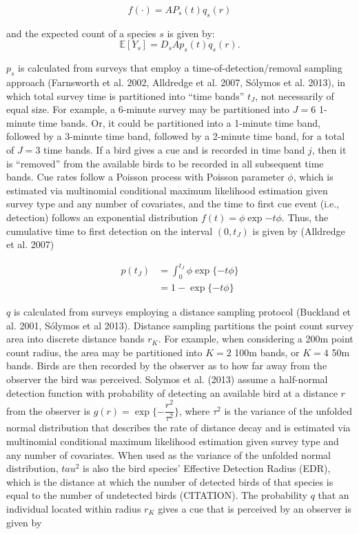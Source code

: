 \documentclass[]{article}
\begin{document}
$$
	f(\cdot) = AP_s(t)q_s(r)
$$

and the expected count of a species $s$ is given by:
\begin{equation}
	\mathbb{E}[Y_s] = D_sAp_s(t)q_s(r).
\end{equation}

$p_s$ is calculated from surveys that employ a time-of-detection/removal sampling approach (Farnsworth et al. 2002, Alldredge et al. 2007, Sólymos et al. 2013), in which total survey time is partitioned into “time bands” $t_J$, not necessarily of equal size. For example, a 6-minute survey may be partitioned into $J=6$ 1-minute time bands. Or, it could be partitioned into a 1-minute time band, followed by a 3-minute time band, followed by a 2-minute time band, for a total of $J=3$ time bands. If a bird gives a cue and is recorded in time band $j$, then it is “removed” from the available birds to be recorded in all subsequent time bands. Cue rates follow a Poisson process with Poisson parameter $\phi$, which is estimated via multinomial conditional maximum likelihood estimation given survey type and any number of covariates, and the time to first cue event (i.e., detection) follows an exponential distribution $f(t) = \phi \exp{-t\phi}$. Thus, the cumulative time to first detection on the interval $(0,t_J)$ is given by (Alldredge et al. 2007)

\begin{align*}
	p(t_J) &= \int_{0}^{t_J}\phi \exp{\{-t\phi\}} \\
	&= 1- \exp{\{-t\phi\}}
\end{align*}

$q$ is calculated from surveys employing a distance sampling protocol (Buckland et al. 2001, Sólymos et al 2013). Distance sampling partitions the point count survey area into discrete distance bands $r_K$. For example, when considering a 200m point count radius, the area may be partitioned into $K=2$ 100m bands, or $K=4$ 50m bands. Birds are then recorded by the observer as to how far away from the observer the bird was perceived. Solymos et al. (2013) assume a half-normal detection function with probability of detecting an available bird at a distance $r$ from the observer is $g(r) = \exp{\{-\dfrac{r^2}{\tau^2}\}}$, where $\tau^2$ is the variance of the unfolded normal distribution that describes the rate of distance decay and is estimated via multinomial conditional maximum likelihood estimation given survey type and any number of covariates. When used as the variance of the unfolded normal distribution, $tau^2$ is also the bird species' Effective Detection Radius (EDR), which is the distance at which the number of detected birds of that species is equal to the number of undetected birds (CITATION). The probability $q$ that an individual located within radius $r_K$ gives a cue that is perceived by an observer is given by
\end{document}
